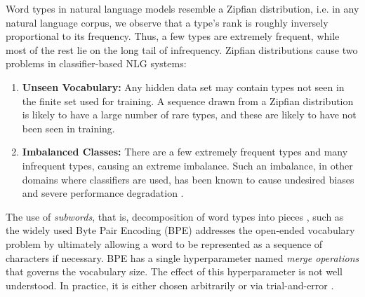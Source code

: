 Word types in natural language models resemble a Zipfian distribution, i.e. in any natural language corpus, we observe that a type's rank is roughly inversely proportional to its frequency. Thus, a few types are extremely frequent, while most of the rest lie on the long tail of infrequency.
Zipfian distributions cause two problems in classifier-based NLG systems:
\begin{enumerate}
    \itemsep0em
    \item \textbf{Unseen Vocabulary:}
    Any hidden data set may contain types not seen in the finite set used for training. A sequence drawn from a Zipfian distribution is likely to have a large number of rare types, and these are likely to have not been seen in training.
    \item \textbf{Imbalanced Classes:} There are a few extremely frequent types and many infrequent types, causing an extreme imbalance.
    Such an imbalance, in other domains where classifiers are used, has been known to cause undesired biases and severe performance degradation \cite{Johnson2019SurveyImbalance}. %
\end{enumerate}

The use of \textit{subwords}, that is, decomposition of word types into pieces
, such as the widely used Byte Pair Encoding (BPE) \cite{sennrich-etal-2016-bpe} addresses the open-ended vocabulary problem by ultimately allowing a word to be represented as a sequence of characters if necessary.
BPE has a single hyperparameter named \textit{merge operations} that governs the vocabulary size.
The effect of this hyperparameter is not well understood.
In practice, it is either chosen arbitrarily or via trial-and-error \cite{DBLP:journals/corr/abs-1810-08641}.

